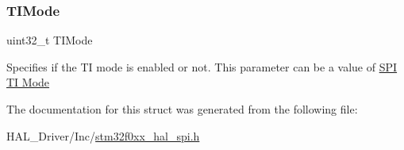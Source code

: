 \subsubsection{\texorpdfstring{T\+I\+Mode}{TIMode}}
{\footnotesize\ttfamily uint32\+\_\+t T\+I\+Mode}

Specifies if the TI mode is enabled or not. This parameter can be a value of \hyperlink{group___s_p_i___t_i__mode}{S\+PI TI Mode} 

The documentation for this struct was generated from the following file\+:\begin{DoxyCompactItemize}
\item 
H\+A\+L\+\_\+\+Driver/\+Inc/\hyperlink{stm32f0xx__hal__spi_8h}{stm32f0xx\+\_\+hal\+\_\+spi.\+h}\end{DoxyCompactItemize}
